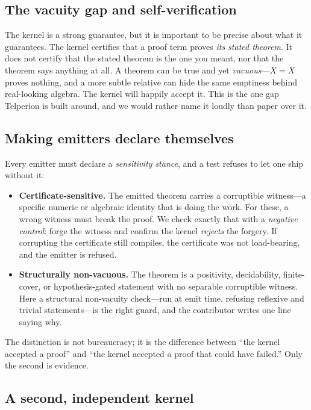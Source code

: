 \subsection{The vacuity gap and self-verification}
\label{sec:vacuity}

The kernel is a strong guarantee, but it is important to be precise about what it
guarantees. The kernel certifies that a proof term proves \emph{its stated
theorem}. It does not certify that the stated theorem is the one you meant, nor
that the theorem says anything at all. A theorem can be true and yet
\emph{vacuous}---$X = X$ proves nothing, and a more subtle relative can hide the
same emptiness behind real-looking algebra. The kernel will happily accept it.
This is the one gap Telperion is built around, and we would rather name it
loudly than paper over it.

\subsection{Making emitters declare themselves}

Every emitter must declare a \emph{sensitivity stance}, and a test refuses to let
one ship without it:

\begin{itemize}
  \item \textbf{Certificate-sensitive.} The emitted theorem carries a corruptible
    witness---a specific numeric or algebraic identity that is doing the work. For
    these, a wrong witness must break the proof. We check exactly that with a
    \emph{negative control}: forge the witness and confirm the kernel
    \emph{rejects} the forgery. If corrupting the certificate still compiles, the
    certificate was not load-bearing, and the emitter is refused.
  \item \textbf{Structurally non-vacuous.} The theorem is a positivity,
    decidability, finite-cover, or hypothesis-gated statement with no separable
    corruptible witness. Here a structural non-vacuity check---run at emit time,
    refusing reflexive and trivial statements---is the right guard, and the
    contributor writes one line saying why.
\end{itemize}

The distinction is not bureaucracy; it is the difference between ``the kernel
accepted a proof'' and ``the kernel accepted a proof that could have failed.''
Only the second is evidence.

\subsection{A second, independent kernel}

